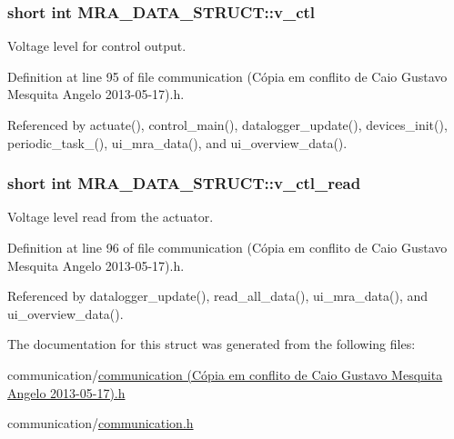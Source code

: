 \hypertarget{structMRA__DATA__STRUCT_a64b4e6bb604e58de593a60c87942b966}{
\subsubsection[{v\-\_\-ctl}]{\setlength{\rightskip}{0pt plus 5cm}short int M\-R\-A\-\_\-\-D\-A\-T\-A\-\_\-\-S\-T\-R\-U\-C\-T\-::v\-\_\-ctl}}\label{structMRA__DATA__STRUCT_a64b4e6bb604e58de593a60c87942b966}


Voltage level for control output. 



Definition at line 95 of file communication (\-Cópia em conflito de Caio Gustavo Mesquita Angelo 2013-\/05-\/17).\-h.



Referenced by actuate(), control\-\_\-main(), datalogger\-\_\-update(), devices\-\_\-init(), periodic\-\_\-task\-\_(), ui\-\_\-mra\-\_\-data(), and ui\-\_\-overview\-\_\-data().

\hypertarget{structMRA__DATA__STRUCT_a3a31d57268c33b21ac915fdc27dfe474}{
\subsubsection[{v\-\_\-ctl\-\_\-read}]{\setlength{\rightskip}{0pt plus 5cm}short int M\-R\-A\-\_\-\-D\-A\-T\-A\-\_\-\-S\-T\-R\-U\-C\-T\-::v\-\_\-ctl\-\_\-read}}\label{structMRA__DATA__STRUCT_a3a31d57268c33b21ac915fdc27dfe474}


Voltage level read from the actuator. 



Definition at line 96 of file communication (\-Cópia em conflito de Caio Gustavo Mesquita Angelo 2013-\/05-\/17).\-h.



Referenced by datalogger\-\_\-update(), read\-\_\-all\-\_\-data(), ui\-\_\-mra\-\_\-data(), and ui\-\_\-overview\-\_\-data().



The documentation for this struct was generated from the following files\-:\begin{DoxyCompactItemize}
\item 
communication/\hyperlink{communication_01_07C_xC3_xB3pia_01em_01conflito_01de_01Caio_01Gustavo_01Mesquita_01Angelo_012013-05-17_08_8h}{communication (\-Cópia em conflito de Caio Gustavo Mesquita Angelo 2013-\/05-\/17).\-h}\item 
communication/\hyperlink{communication_2communication_8h}{communication.\-h}\end{DoxyCompactItemize}

